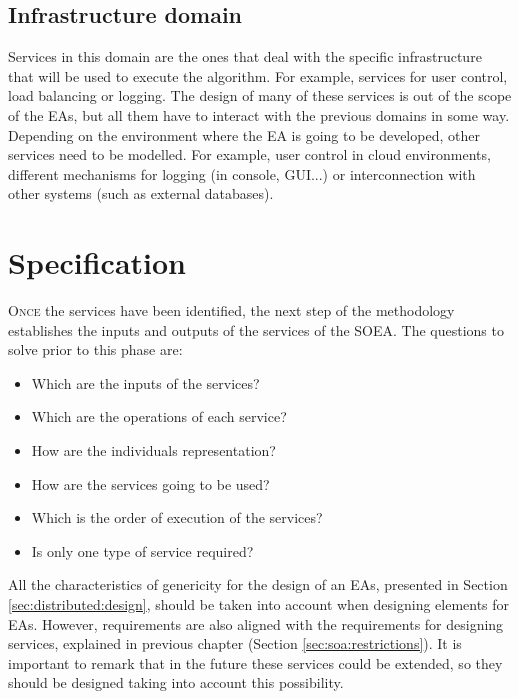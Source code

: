\subsection{Infrastructure domain} Services in this domain are the ones that deal with the specific infrastructure that will be used to execute the algorithm. For example, services for user control, load balancing or logging. The design of many of these services is out of the scope of the EAs, but all them have to interact with the previous domains in some way. Depending on the environment where the EA is going to be developed, other services need to be modelled. For example, user control in cloud environments, different mechanisms for logging (in console, GUI...) or interconnection with other systems (such as external databases).

 

\section{Specification}

\lettrine{O}{nce} the services have been identified, the next step of the methodology establishes the inputs and outputs of the services of the SOEA. The questions to solve prior to this phase are:

\begin{itemize}
\item Which are the inputs of the services?
\item Which are the operations of each service?
\item How are the individuals representation?
\item How are the services going to be used?
\item Which is the order of execution of the services?
\item Is only one type of service required?
\end{itemize}

All the characteristics of genericity for the design of an EAs, presented in Section \ref{sec:distributed:design}, should be taken into account when designing elements for EAs. However, requirements are also aligned with the requirements for designing services, explained in previous chapter (Section \ref{sec:soa:restrictions}). It is important to remark that in the future these services could be extended, so they should be designed taking into account this possibility.



